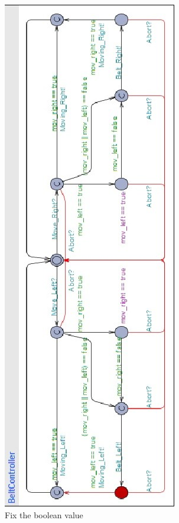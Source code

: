 \documentclass[a4paper,oneside,11pt]{report}
\begin{document}
\begin{figure}
\centering
\includegraphics[height=0.75\textheight]{images/BCTL3.jpg}
\caption{Fix the boolean value}
\label{fig:bctl3}
\end{figure}
\end{document}
